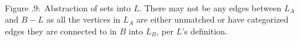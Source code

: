 \documentclass[twoside]{article}
\newcounter{lecnum}
\newcommand{\fig}[3]{
      \vspace{#2}
      \begin{center}
      Figure \thelecnum.#1:~#3
      \end{center}
  }
\begin{document}
\begin{minipage}{0.4\textwidth}
\\
\fig{9}{0in}{Abstraction of sets into $L$. There may not be any edges between $L_A$ and $B - L$ as all the vertices in $L_A$ are either unmatched or have categorized edges they are connected to in $B$ into $L_B$, per $L$'s definition.}
\end{minipage}
\end{document}
